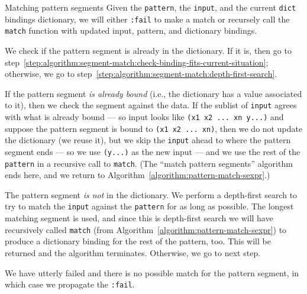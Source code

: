 \begin{algorithm}{Matching pattern segments}\label{algorithm:match-pattern-segments}
Given the \lstinline[language=lisp]{pattern},
the \lstinline[language=lisp]{input}, and the current
\lstinline[language=lisp]{dict} bindings dictionary, we will either
\lstinline[language=lisp]{:fail} to make a match or recursely call the
\lstinline[language=lisp]{match} function with updated input, pattern,
and dictionary bindings.

We check if the pattern segment is already in the dictionary. If it is,
then go to step~\ref{step:algorithm:segment-match:check-binding-fits-current-situation}; otherwise, we go to step~\ref{step:algorithm:segment-match:depth-first-search}.

\label{step:algorithm:segment-match:check-binding-fits-current-situation}
If the pattern segment \emph{is already bound} (i.e., the dictionary has
a value associated to it), then we check the segment against the data.
If the sublist of \lstinline[language=lisp]{input} agrees with what is
already bound --- so input looks like \lstinline[language=lisp]{(x1 x2 ... xn y...)}
and suppose the pattern segment is bound to \lstinline[language=lisp]{(x1 x2 ... xn)}, then we
do not update the dictionary (we reuse it),
but we skip the \lstinline[language=lisp]{input} ahead to where the
pattern segment ends --- so we use \lstinline[language=lisp]{(y...)} as
the new input --- and we use the rest of the
\lstinline[language=lisp]{pattern} in a recursive call to
\lstinline[language=lisp]{match}. (The ``match pattern segments''
algorithm ends here, and we return to Algorithm~\ref{algorithm:pattern-match-sexpr}.)

\label{step:algorithm:segment-match:depth-first-search}
The pattern segment \emph{is not} in the dictionary. We perform a
depth-first search to try to match the \lstinline[language=lisp]{input}
against the \lstinline[language=lisp]{pattern} for as long as possible.
The longest matching segment is used, and since this is depth-first
search we will have recursively called \lstinline[language=lisp]{match}
(from Algorithm~\ref{algorithm:pattern-match-sexpr})
to produce a dictionary binding for the rest of the pattern, too. This
will be returned and the algorithm terminates. Otherwise, we go to next step.

\step [Failure]
We have utterly failed and there is no possible match for the pattern
segment, in which case we propagate the \lstinline[language=lisp]{:fail}.\quad\qedsymbol
\end{algorithm}

